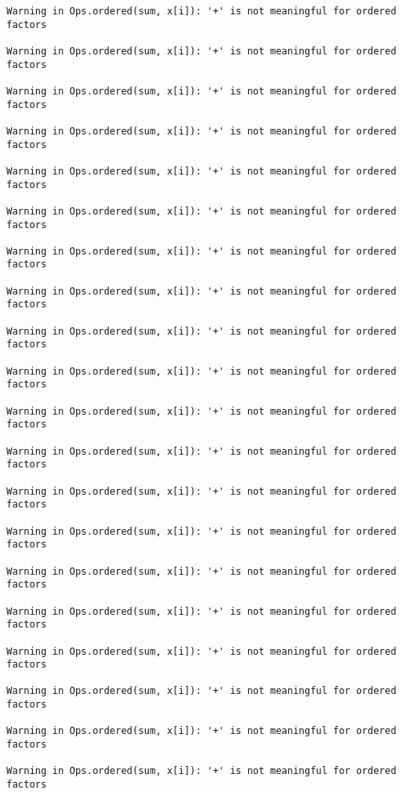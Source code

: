 \documentclass[]{article}
\begin{document}
\begin{verbatim}
Warning in Ops.ordered(sum, x[i]): '+' is not meaningful for ordered
factors

Warning in Ops.ordered(sum, x[i]): '+' is not meaningful for ordered
factors

Warning in Ops.ordered(sum, x[i]): '+' is not meaningful for ordered
factors

Warning in Ops.ordered(sum, x[i]): '+' is not meaningful for ordered
factors

Warning in Ops.ordered(sum, x[i]): '+' is not meaningful for ordered
factors

Warning in Ops.ordered(sum, x[i]): '+' is not meaningful for ordered
factors

Warning in Ops.ordered(sum, x[i]): '+' is not meaningful for ordered
factors

Warning in Ops.ordered(sum, x[i]): '+' is not meaningful for ordered
factors

Warning in Ops.ordered(sum, x[i]): '+' is not meaningful for ordered
factors

Warning in Ops.ordered(sum, x[i]): '+' is not meaningful for ordered
factors

Warning in Ops.ordered(sum, x[i]): '+' is not meaningful for ordered
factors

Warning in Ops.ordered(sum, x[i]): '+' is not meaningful for ordered
factors

Warning in Ops.ordered(sum, x[i]): '+' is not meaningful for ordered
factors

Warning in Ops.ordered(sum, x[i]): '+' is not meaningful for ordered
factors

Warning in Ops.ordered(sum, x[i]): '+' is not meaningful for ordered
factors

Warning in Ops.ordered(sum, x[i]): '+' is not meaningful for ordered
factors

Warning in Ops.ordered(sum, x[i]): '+' is not meaningful for ordered
factors

Warning in Ops.ordered(sum, x[i]): '+' is not meaningful for ordered
factors

Warning in Ops.ordered(sum, x[i]): '+' is not meaningful for ordered
factors

Warning in Ops.ordered(sum, x[i]): '+' is not meaningful for ordered
factors
\end{verbatim}
\end{document}
